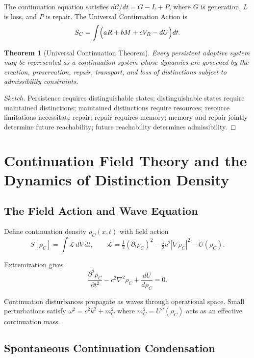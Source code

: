 \documentclass[12pt,a4paper]{article}
\newtheorem{theorem}{Theorem}[section]
\begin{document}
The continuation equation satisfies $d\mathcal{C}/dt = G - L + P$, where $G$ is generation, $L$ is loss, and $P$ is repair. The Universal Continuation Action is
\[
S_C = \int \Bigl( aR + bM + cV_R - dU \Bigr) dt.
\]

\begin{theorem}[Universal Continuation Theorem]
Every persistent adaptive system may be represented as a continuation system whose dynamics are governed by the creation, preservation, repair, transport, and loss of distinctions subject to admissibility constraints.
\end{theorem}

\begin{proof}[Sketch]
Persistence requires distinguishable states; distinguishable states require maintained distinctions; maintained distinctions require resources; resource limitations necessitate repair; repair requires memory; memory and repair jointly determine future reachability; future reachability determines admissibility.
\end{proof}

\section{Continuation Field Theory and the Dynamics of Distinction Density}

\subsection{The Field Action and Wave Equation}

Define continuation density $\rho_C(x,t)$ with field action
\[
S[\rho_C] = \int \mathcal{L}\, dV\, dt, \qquad \mathcal{L} = \tfrac{1}{2}(\partial_t\rho_C)^2 - \tfrac{1}{2}c^2|\nabla\rho_C|^2 - U(\rho_C).
\]

Extremization gives
\[
\frac{\partial^2\rho_C}{\partial t^2} - c^2\nabla^2\rho_C + \frac{dU}{d\rho_C} = 0.
\]

Continuation disturbances propagate as waves through operational space. Small perturbations satisfy $\omega^2 = c^2k^2 + m_C^2$ where $m_C^2 = U''(\rho_C)$ acts as an effective continuation mass.

\subsection{Spontaneous Continuation Condensation}
\end{document}

